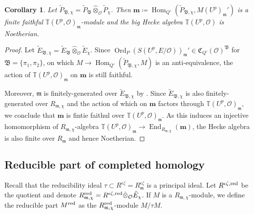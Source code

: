 \documentclass[leqno]{amsart}
\newcommand{\TT}{\mathbb{T}} %
\newcommand{\B}{\mathfrak B}
\newcommand{\fC}{\mathfrak{C}}
\DeclareMathOperator{\Ord}{Ord}
\newcommand{\red}{\textnormal{red}}
\newcommand{\oo}{\mathcal{O}} %
\newcommand{\fm}{\mathfrak{m}}
\DeclareMathOperator{\End}{End}
\DeclareMathOperator{\Hom}{Hom}
\newtheorem{cor}[thm]{Corollary}
\theoremstyle{definition}
\theoremstyle{remark}
\begin{document}
\begin{cor}\label{cor:Hecke_Noetherian}
	Let $\tilde{P}_{\B,\chi}
	=\tilde{P}_\B\hat{\otimes}_{\oo}\tilde{P}_\chi$.
	Then $\mathbf{m}\coloneqq
	\Hom_{Q'}(\tilde{P}_{\B,\chi},M(U^p)_{\fm}')$
	is a finite faithful $\TT(U^p,\oo)_{\fm}$-module
	and the big Hecke algebra
	$\TT(U^p,\oo)$ is Noetherian.
\end{cor}
\begin{proof}
	Let $\tilde{E}_{\B,\chi}
	=\tilde{E}_\B\hat{\otimes}_{\oo}\tilde{E}_\chi$.
	Since $\Ord_P(S(U^p,E/\oo))_\fm'
	\in \fC_{Q'}(\oo)^{\B}$
	for $\B=\{\pi_1,\pi_2\}$,
	on which $M\to \Hom_{Q'}(\tilde{P}_{\B,\chi},M)$
	is an anti-equivalence,
	the action of $\TT(U^p,\oo)_\fm$
	on $\mathbf{m}$ is still faithful.

	Moreover, $\fm$ is finitely-generated
	over  $ \tilde{E}_{\B,\chi}$
	by \cite[Prop 4.17]{pask}.
	Since $ \tilde{E}_{\B,\chi}$
	is also finitely-generated
	over $R_{\fm,\chi}$
	and the action of which on $\mathbf{m}$
	factors through $\TT(U^p,\oo)_{\fm}$,
	we conclude that $\mathbf{m}$ 
	is fintie faithul over $\TT(U^p,\oo)_{\fm}$.
	As this induces an injective homomorphism
	of $R_{\fm,\chi}$-algebra
	$\TT(U^p,\oo)_{\fm}\to 
	\End_{R_{\fm,\chi}}(\mathbf{m})$,
	the Hecke algebra
	is also finite over $R_{\fm}$ and hence Noetherian.
\end{proof}


\subsection{Reducible part of completed homology}

Recall that the reducibility ideal 
$\tau\subset R^{\epsilon\zeta}=R^{\epsilon\zeta}_{\fm}$
is a principal ideal.
Let $R^{\epsilon\zeta,\red}$ be the quotient 
and denote $R_{\fm,\chi}^{\red}=R^{\epsilon\zeta,\red}
\hat{\otimes}_{\oo}\tilde{E}_\chi$.
If $M$ is a  $R_{\fm,\chi}$-module,
we define the reducible part $M^{\red}$ 
as the $R_{\fm,\chi}^{\red}$-module
$M/\tau M$.
\end{document}

